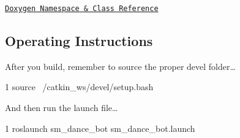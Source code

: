 \href{https://reelrbtx.github.io/SMACC/master/html/namespacesm__dance__bot.html}{\tt Doxygen Namespace \& Class Reference}

\subsection*{Operating Instructions}

After you build, remember to source the proper devel folder… 
\begin{DoxyCode}
1 source ~/catkin\_ws/devel/setup.bash
\end{DoxyCode}
 And then run the launch file… 
\begin{DoxyCode}
1 roslaunch sm\_dance\_bot sm\_dance\_bot.launch
\end{DoxyCode}
 